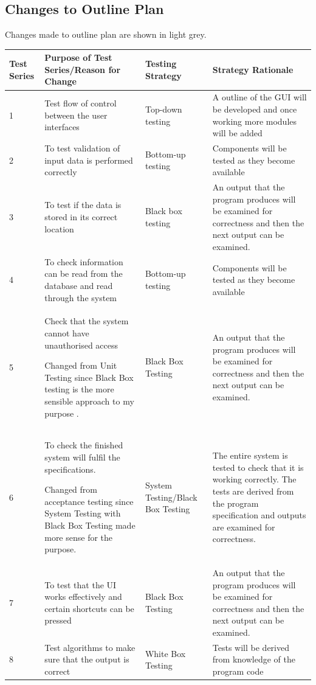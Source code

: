 \begin{landscape}
\begin{center}
\begin{tabular}{|p{2cm}|p{5cm}|p{5cm}|p{4cm}|}
    \end{tabular}
\end{center}

\subsection{Changes to Outline Plan}

Changes made to outline plan are shown in light grey. 

\begin{center}
    \begin{tabular}{|p{2cm}|p{5cm}|p{5cm}|p{4cm}|}
        \hline
        \textbf{Test Series} & \textbf{Purpose of Test Series/Reason for Change} & \textbf{Testing Strategy} & \textbf{Strategy Rationale}\\ \hline
1 & Test flow of control between the user interfaces & Top-down testing & A outline of the GUI will be developed and once working more modules will be added \\ \hline
       2 & To test validation of input data is performed correctly & Bottom-up testing & Components will be tested as they become available \\ \hline
3 & To test if the data is stored in its correct location & Black box testing & An output that the program produces will be examined for correctness and then the next output can be examined.\\ \hline
4 & To check information can be read from the database and read through the system & Bottom-up testing &  Components will be tested as they become available\\ \hline
\rowcolor{lightgray}5 & Check that the system cannot have unauthorised access \par Changed from Unit Testing since Black Box testing is the more sensible approach to my purpose . & Black Box Testing & An output that the program produces will be examined for correctness and then the next output can be examined. \\ \hline
\rowcolor{lightgray}6 & To check the finished system will fulfil the specifications. \par Changed from acceptance testing since System Testing with Black Box Testing made more sense for the purpose. &  System Testing/Black Box Testing & The entire system is tested to check that it is working correctly. The tests are derived from the program specification and outputs are examined for correctness. \\ \hline
7 & To test that the UI works effectively and certain shortcuts can be pressed & Black Box Testing & An output that the program produces will be examined for correctness and then the next output can be examined.\\ \hline
8 & Test algorithms to make sure that the output is correct & White Box Testing & Tests will be derived from knowledge of the program code \\ \hline


\end{tabular}
\end{center}
\end{landscape}
